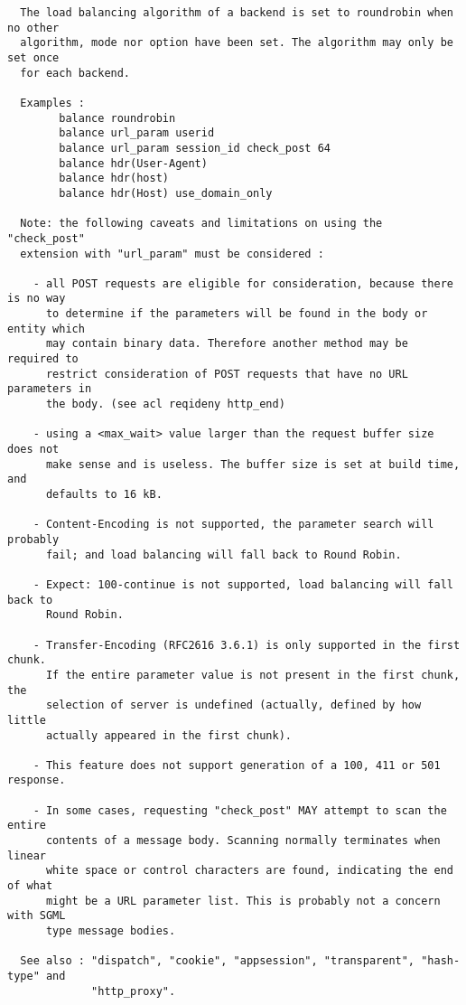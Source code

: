 \begin{verbatim}
  The load balancing algorithm of a backend is set to roundrobin when no other
  algorithm, mode nor option have been set. The algorithm may only be set once
  for each backend.

  Examples :
        balance roundrobin
        balance url_param userid
        balance url_param session_id check_post 64
        balance hdr(User-Agent)
        balance hdr(host)
        balance hdr(Host) use_domain_only

  Note: the following caveats and limitations on using the "check_post"
  extension with "url_param" must be considered :

    - all POST requests are eligible for consideration, because there is no way
      to determine if the parameters will be found in the body or entity which
      may contain binary data. Therefore another method may be required to
      restrict consideration of POST requests that have no URL parameters in
      the body. (see acl reqideny http_end)

    - using a <max_wait> value larger than the request buffer size does not
      make sense and is useless. The buffer size is set at build time, and
      defaults to 16 kB.

    - Content-Encoding is not supported, the parameter search will probably
      fail; and load balancing will fall back to Round Robin.

    - Expect: 100-continue is not supported, load balancing will fall back to
      Round Robin.

    - Transfer-Encoding (RFC2616 3.6.1) is only supported in the first chunk.
      If the entire parameter value is not present in the first chunk, the
      selection of server is undefined (actually, defined by how little
      actually appeared in the first chunk).

    - This feature does not support generation of a 100, 411 or 501 response.

    - In some cases, requesting "check_post" MAY attempt to scan the entire
      contents of a message body. Scanning normally terminates when linear
      white space or control characters are found, indicating the end of what
      might be a URL parameter list. This is probably not a concern with SGML
      type message bodies.

  See also : "dispatch", "cookie", "appsession", "transparent", "hash-type" and
             "http_proxy".



\end{verbatim}
